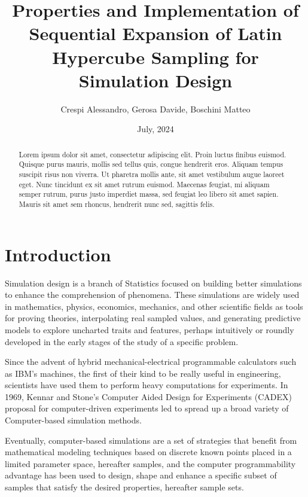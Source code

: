 \documentclass[12pt]{extarticle}
\begin{document}
\title{Properties and Implementation of Sequential Expansion of Latin Hypercube Sampling for Simulation Design}
\author{Crespi Alessandro, Gerosa Davide, Boschini Matteo}
\date{July, 2024}
\maketitle

\tableofcontents
\pagebreak

\begin{abstract}
Lorem ipsum dolor sit amet, consectetur adipiscing elit. Proin luctus finibus euismod. Quisque purus mauris, mollis sed tellus quis, congue hendrerit eros. Aliquam tempus suscipit risus non viverra. Ut pharetra mollis ante, sit amet vestibulum augue laoreet eget. Nunc tincidunt ex sit amet rutrum euismod. Maecenas feugiat, mi aliquam semper rutrum, purus justo imperdiet massa, sed feugiat leo libero sit amet sapien. Mauris sit amet sem rhoncus, hendrerit nunc sed, sagittis felis. 
\end{abstract}


\section{Introduction}
Simulation design is a branch of Statistics focused on building better simulations to enhance the comprehension of phenomena. These simulations are widely used in mathematics, physics, economics, mechanics, and other scientific fields as tools for proving theories, interpolating real sampled values, and generating predictive models to explore uncharted traits and features, perhaps intuitively or roundly developed in the early stages of the study of a specific problem.

Since the advent of hybrid mechanical-electrical programmable calculators such as IBM's machines, the first of their kind to be really useful in engineering, scientists have used them to perform heavy computations for experiments. In 1969, Kennar and Stone's Computer Aided Design for Experiments (CADEX) proposal for computer-driven experiments led to spread up a broad variety of Computer-based simulation methods.

Eventually, computer-based simulations are a set of strategies that benefit from mathematical modeling techniques based on discrete known points placed in a limited parameter space, hereafter samples, and the computer programmability advantage has been used to design, shape and enhance a specific subset of samples that satisfy the desired properties, hereafter sample sets. 
\end{document}
